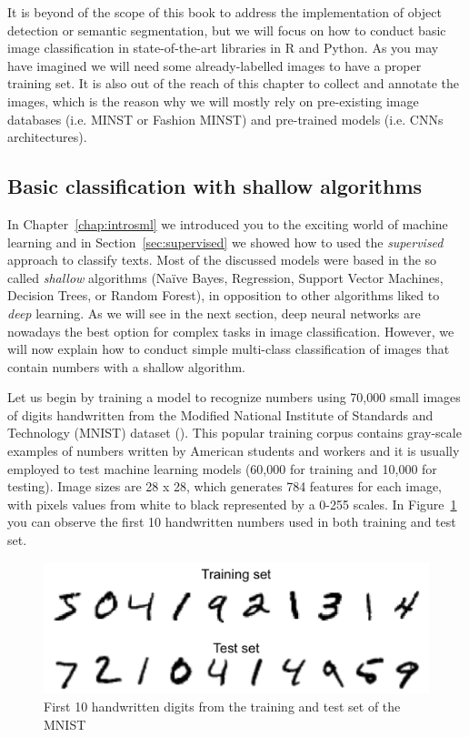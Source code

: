 It is beyond of the scope of this book to address the implementation of object detection or semantic segmentation, but we will focus on how to conduct basic image classification in state-of-the-art libraries in R and Python. As you may have imagined we will need some already-labelled images to have a proper training set. It is also out of the reach of this chapter to collect and annotate the images, which is the reason why we will mostly rely on pre-existing image databases (i.e. MINST or Fashion MINST) and pre-trained models (i.e. CNNs architectures). 

\subsection{Basic classification with shallow algorithms}
\label{subsec:shallow}

In Chapter~\ref{chap:introsml} we introduced you to the exciting world of machine learning and in Section~\ref{sec:supervised} we showed how to used the \textit{supervised} approach to classify texts. Most of the discussed models were based in the so called \textit{shallow} algorithms (Naïve Bayes, Regression, Support Vector Machines, Decision Trees, or Random Forest), in opposition to other algorithms liked to \textit{deep} learning. As we will see in the next section, deep neural networks are nowadays the best option for complex tasks in image classification. However, we will now explain how to conduct simple multi-class classification of images that contain numbers with a shallow algorithm.

Let us begin by training a model to recognize numbers using 70,000 small images of digits handwritten from the Modified National Institute of Standards and Technology (MNIST) dataset  (\cite{lecun1998gradient}). This popular training corpus contains gray-scale examples of numbers written by American students and workers and it is usually employed to test machine learning models (60,000 for training and 10,000 for testing). Image sizes are 28 x 28, which generates 784 features for each image, with pixels values from white to black represented by a 0-255 scales. In Figure~\ref{fig:numbers} you can observe the first 10 handwritten numbers used in both training and test set.

\begin{figure}
\centering
\includegraphics[width=0.9\linewidth]{figures/ch15_numbers.png}
\caption{First 10 handwritten digits from the training and test set of the MNIST}
\label{fig:numbers}
\end{figure}

